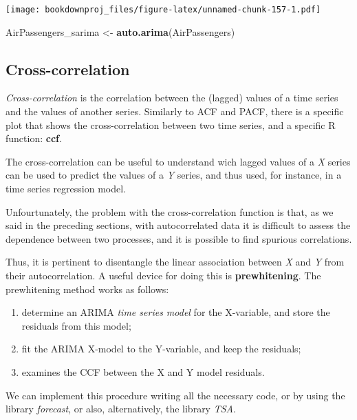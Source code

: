 \documentclass[
]{article}
\newenvironment{Shaded}{\begin{snugshade}}{\end{snugshade}}
\newcommand{\KeywordTok}[1]{\textcolor[rgb]{0.13,0.29,0.53}{\textbf{#1}}}
\newcommand{\NormalTok}[1]{#1}
\newcommand{\StringTok}[1]{\textcolor[rgb]{0.31,0.60,0.02}{#1}}
\providecommand{\tightlist}{%
  \setlength{\itemsep}{0pt}\setlength{\parskip}{0pt}}
\begin{document}
\texttt{[image: bookdownproj\_files/figure-latex/unnamed-chunk-157-1.pdf]}

\begin{Shaded}
\begin{Highlighting}[]
\NormalTok{AirPassengers_sarima <-}\StringTok{ }\KeywordTok{auto.arima}\NormalTok{(AirPassengers)}
\end{Highlighting}
\end{Shaded}

\hypertarget{cross-correlation}{%
\subsection{Cross-correlation}\label{cross-correlation}}

\emph{Cross-correlation }is the correlation between the (lagged) values of a time series and the values of another series. Similarly to ACF and PACF, there is a specific plot that shows the cross-correlation between two time series, and a specific R function: \textbf{ccf}.

The cross-correlation can be useful to understand wich lagged values of a \emph{X} series can be used to predict the values of a \emph{Y} series, and thus used, for instance, in a time series regression model.

Unfourtunately, the problem with the cross-correlation function is that, as we said in the preceding sections, with autocorrelated data it is difficult to assess the dependence between two processes, and it is possible to find spurious correlations.

Thus, it is pertinent to disentangle the linear association between \emph{X} and \emph{Y} from their autocorrelation. A useful device for doing this is \textbf{prewhitening}. The prewhitening method works as follows:

\begin{enumerate}
\def\labelenumi{\arabic{enumi})}
\tightlist
\item
  determine an ARIMA \emph{time series model} for the X-variable, and store the residuals from this model;
\item
  fit the ARIMA X-model to the Y-variable, and keep the residuals;
\item
  examines the CCF between the X and Y model residuals.
\end{enumerate}

We can implement this procedure writing all the necessary code, or by using the library \emph{forecast}, or also, alternatively, the library \emph{TSA}.
\end{document}
